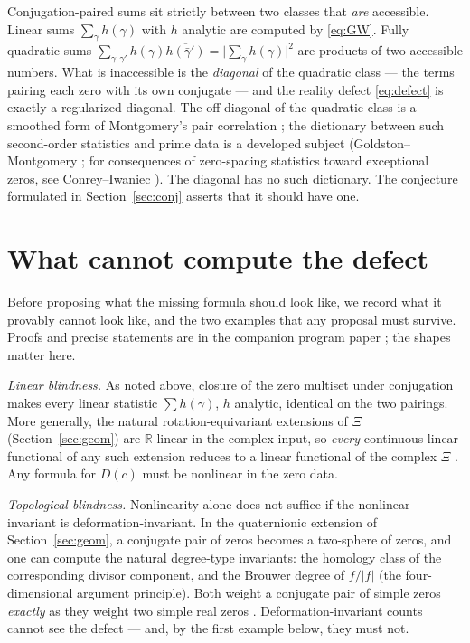 \documentclass[11pt]{amsart}
\theoremstyle{definition}
\theoremstyle{remark}
\newcommand{\RR}{\mathbb{R}}
\begin{document}
Conjugation-paired sums sit strictly between two classes that \emph{are} accessible. Linear sums $\sum_\gamma h(\gamma)$ with $h$ analytic are computed by \eqref{eq:GW}. Fully quadratic sums $\sum_{\gamma,\gamma'}h(\gamma)\overline{h(\bar\gamma')}=\big|\sum_\gamma h(\gamma)\big|^2$ are products of two accessible numbers. What is inaccessible is the \emph{diagonal} of the quadratic class --- the terms pairing each zero with its own conjugate --- and the reality defect \eqref{eq:defect} is exactly a regularized diagonal. The off-diagonal of the quadratic class is a smoothed form of Montgomery's pair correlation \cite{Montgomery}; the dictionary between such second-order statistics and prime data is a developed subject (Goldston--Montgomery \cite{GoldstonMontgomery}; for consequences of zero-spacing statistics toward exceptional zeros, see Conrey--Iwaniec \cite{ConreyIwaniec}). The diagonal has no such dictionary. The conjecture formulated in Section~\ref{sec:conj} asserts that it should have one.

\section{What cannot compute the defect}\label{sec:nogo}

Before proposing what the missing formula should look like, we record what it provably cannot look like, and the two examples that any proposal must survive. Proofs and precise statements are in the companion program paper \cite{ZS}; the shapes matter here.

\emph{Linear blindness.} As noted above, closure of the zero multiset under conjugation makes every linear statistic $\sum h(\gamma)$, $h$ analytic, identical on the two pairings. More generally, the natural rotation-equivariant extensions of $\Xi$ (Section~\ref{sec:geom}) are $\RR$-linear in the complex input, so \emph{every} continuous linear functional of any such extension reduces to a linear functional of the complex $\Xi$ \cite{Baker2015,ZS}. Any formula for $D(c)$ must be nonlinear in the zero data.

\emph{Topological blindness.} Nonlinearity alone does not suffice if the nonlinear invariant is deformation-invariant. In the quaternionic extension of Section~\ref{sec:geom}, a conjugate pair of zeros becomes a two-sphere of zeros, and one can compute the natural degree-type invariants: the homology class of the corresponding divisor component, and the Brouwer degree of $f/|f|$ (the four-dimensional argument principle). Both weight a conjugate pair of simple zeros \emph{exactly} as they weight two simple real zeros \cite{ZS}. Deformation-invariant counts cannot see the defect --- and, by the first example below, they must not.
\end{document}
